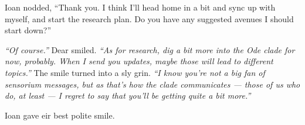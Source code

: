 Ioan nodded, ``Thank you. I think I'll head home in a bit and sync up with myself, and start the research plan. Do you have any suggested avenues I should start down?''

\emph{``Of course.''} Dear smiled. \emph{``As for research, dig a bit more into the Ode clade for now, probably. When I send you updates, maybe those will lead to different topics.''} The smile turned into a sly grin. \emph{``I know you're not a big fan of sensorium messages, but as that's how the clade communicates --- those of us who do, at least --- I regret to say that you'll be getting quite a bit more.''}

Ioan gave eir best polite smile.
